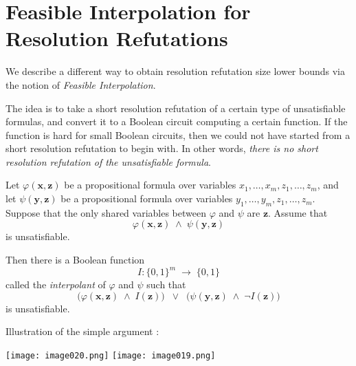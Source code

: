 \section{Feasible Interpolation for Resolution Refutations}
We describe a different way to obtain resolution refutation size lower bounds via the notion of \emph{Feasible Interpolation}. 

The idea is to take a short resolution refutation of a certain type of unsatisfiable formulas, and convert it to a Boolean circuit computing a certain function. If the function is hard for small Boolean circuits, then we could not have started from a short resolution refutation to begin with. In other words, \emph{there is no short resolution refutation of the unsatisfiable formula}.


\bigskip

\begin{theorem}
Let \(\varphi(\mathbf{x},\mathbf{z})\) be a propositional formula over variables \(x_{1},\dots,x_{m}, z_{1},\dots,z_{m}\), and let \(\psi(\mathbf{y},\mathbf{z})\) be a propositional formula over variables \(y_{1},\dots,y_{m}, z_{1},\dots,z_{m}\). 
Suppose that the only shared variables between \(\varphi\) and \(\psi\) are \(\mathbf{z}\). 
Assume that 
\[
\varphi(\mathbf{x},\mathbf{z}) \;\land\; \psi(\mathbf{y},\mathbf{z})
\]
is unsatisfiable.

Then there is a Boolean function 
\[
I \colon \{0,1\}^m \;\to\;\{0,1\}
\]
called the \emph{interpolant} of \(\varphi\) and \(\psi\) such that
\[
\bigl(\varphi(\mathbf{x},\mathbf{z}) \;\land\; I(\mathbf{z})\bigr)
\;\;\lor\;\;
\bigl(\psi(\mathbf{y},\mathbf{z}) \;\land\;\neg I(\mathbf{z})\bigr)
\]
is unsatisfiable.
\end{theorem}

Illustration of the simple argument :

\texttt{[image: image020.png]}
\texttt{[image: image019.png]}



